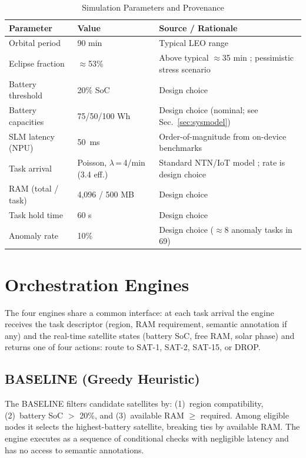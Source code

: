 \documentclass[conference,comsoc,twoside,caption=false]{IEEEtran}
\let\MYoriglatexcaption\caption
\renewcommand{\caption}[2][\relax]{\MYoriglatexcaption[#2]{#2}}
\theoremstyle{definition}
\begin{document}
\begin{table}[!t]
\centering
\caption{Simulation Parameters and Provenance}
\label{tab:params}
\footnotesize
\begin{tabular}{p{2.2cm}p{1.5cm}p{3.9cm}}
\toprule
\textbf{Parameter} & \textbf{Value} & \textbf{Source / Rationale} \\
\midrule
Orbital period   & 90 min           & Typical LEO range \cite{guo2024,gpp2022} \\
Eclipse fraction & $\approx$53\%    & Above typical $\approx$35 min \cite{sumanth2019}; pessimistic stress scenario \\
Battery threshold & 20\% SoC        & Design choice \\
Battery capacities & 75/50/100 Wh  & Design choice (nominal; see Sec.~\ref{sec:sysmodel}) \\
SLM latency (NPU) & \SI{50}{\milli\second} & Order-of-magnitude from on-device benchmarks \cite{wang2025} \\
Task arrival     & Poisson, $\lambda$\,=\,4/min (3.4 eff.) & Standard NTN/IoT model \cite{guo2024}; rate is design choice \\
RAM (total / task) & 4{,}096 / 500 MB & Design choice \\
Task hold time   & 60 s             & Design choice \\
Anomaly rate     & 10\%             & Design choice ($\approx$8 anomaly tasks in 69) \\
\bottomrule
\end{tabular}
\end{table}

\section{Orchestration Engines}
\label{sec:engines}

The four engines share a common interface: at each task arrival the engine
receives the task descriptor (region, RAM requirement, semantic annotation if
any) and the real-time satellite states (battery \ac{SoC}, free RAM, solar
phase) and returns one of four actions: route to SAT-1, SAT-2, SAT-15, or DROP.

\subsection{BASELINE (Greedy Heuristic)}
The BASELINE filters candidate satellites by: (1)~region compatibility,
(2)~battery \ac{SoC} $>$ 20\%, and (3)~available RAM $\geq$ required. Among
eligible nodes it selects the highest-battery satellite, breaking ties by
available RAM. The engine executes as a sequence of conditional checks with
negligible latency and has no access to semantic annotations.
\end{document}
